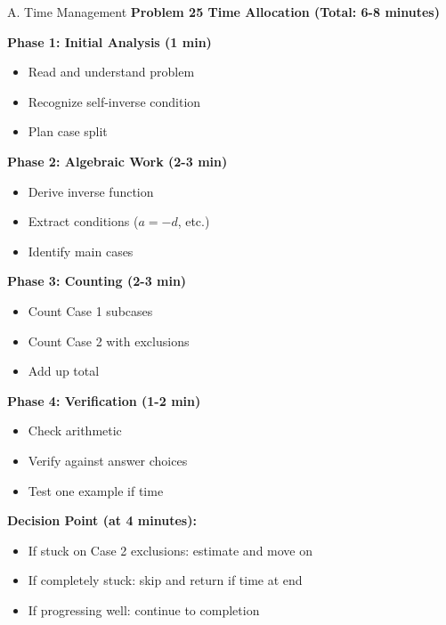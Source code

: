 \documentclass[12pt]{article}
\begin{document}
\begin{competitionbox}{A. Time Management}
\textbf{Problem 25 Time Allocation (Total: 6-8 minutes)}

\textbf{Phase 1: Initial Analysis (1 min)}
\begin{itemize}
    \item Read and understand problem
    \item Recognize self-inverse condition
    \item Plan case split
\end{itemize}

\textbf{Phase 2: Algebraic Work (2-3 min)}
\begin{itemize}
    \item Derive inverse function
    \item Extract conditions ($a=-d$, etc.)
    \item Identify main cases
\end{itemize}

\textbf{Phase 3: Counting (2-3 min)}
\begin{itemize}
    \item Count Case 1 subcases
    \item Count Case 2 with exclusions
    \item Add up total
\end{itemize}

\textbf{Phase 4: Verification (1-2 min)}
\begin{itemize}
    \item Check arithmetic
    \item Verify against answer choices
    \item Test one example if time
\end{itemize}

\textbf{Decision Point (at 4 minutes):}
\begin{itemize}
    \item If stuck on Case 2 exclusions: estimate and move on
    \item If completely stuck: skip and return if time at end
    \item If progressing well: continue to completion
\end{itemize}
\end{competitionbox}
\end{document}
